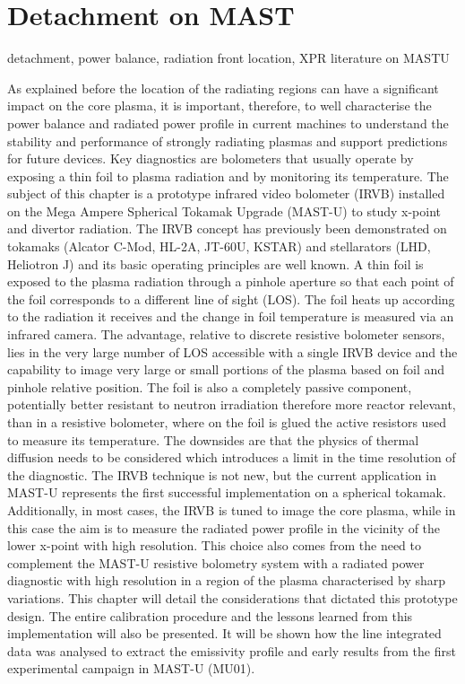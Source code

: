
\section{Detachment on MAST}
detachment, power balance, radiation front location, XPR literature on MASTU


As explained before the location of the radiating regions can have a significant impact on the core plasma\cite{Reimold2015}, it is important, therefore, to well characterise the power balance and radiated power profile in current machines to understand the stability and performance of strongly radiating plasmas and support predictions for future devices. 
Key diagnostics are bolometers that usually operate by exposing a thin foil to plasma radiation and by monitoring its temperature. The subject of this chapter is a prototype infrared video bolometer (IRVB) installed on the Mega Ampere Spherical Tokamak Upgrade (MAST-U) to study x-point and divertor radiation.
The IRVB concept has previously been demonstrated on tokamaks (Alcator C-Mod\cite{Reinke2018a}, HL-2A\cite{Gao2013}, JT-60U\cite{Peterson2007}, KSTAR\cite{Jang2018,Peterson2018}) and stellarators (LHD\cite{Peterson2000,PETERSON2010}, Heliotron J\cite{Miyashita2021}) and its basic operating principles are well known. A thin foil is exposed to the plasma radiation through a pinhole aperture so that each point of the foil corresponds to a different line of sight (LOS). The foil heats up according to the radiation it receives and the change in foil temperature is measured via an infrared camera. The advantage, relative to discrete resistive bolometer sensors\cite{Mast1991}, lies in the very large number of LOS accessible with a single IRVB device and the capability to image very large or small portions of the plasma based on foil and pinhole relative position. The foil is also a completely passive component, potentially better resistant to neutron irradiation therefore more reactor relevant, than in a resistive bolometer, where on the foil is glued the active resistors used to measure its temperature. The downsides are that the physics of thermal diffusion needs to be considered which introduces a limit in the time resolution of the diagnostic. 
The IRVB technique is not new, but the current application in MAST-U represents the first successful implementation on a spherical tokamak. Additionally, in most cases, the IRVB is tuned to image the core plasma, while in this case the aim is to measure the radiated power profile in the vicinity of the lower x-point with high resolution. This choice also comes from the need to complement the MAST-U resistive bolometry system with a radiated power diagnostic with high resolution in a region of the plasma characterised by sharp variations.
This chapter will detail the considerations that dictated this prototype design. The entire calibration procedure and the lessons learned from this implementation will also be presented. It will be shown how the line integrated data was analysed to extract the emissivity profile and early results from the first experimental campaign in MAST-U (MU01).


